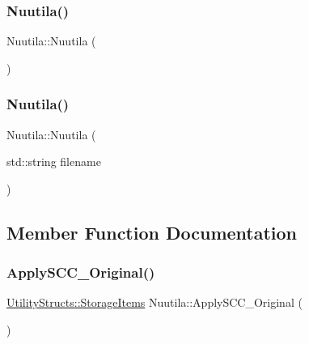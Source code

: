 \subsubsection{\texorpdfstring{Nuutila()}{Nuutila()}\hspace{0.1cm}{\footnotesize\ttfamily [1/2]}}
{\footnotesize\ttfamily Nuutila\+::\+Nuutila (\begin{DoxyParamCaption}{ }\end{DoxyParamCaption})\hspace{0.3cm}{\ttfamily [inline]}}

\mbox{\label{class_nuutila_a00bb9066a5a1c9fb03e25481f4f47a0c_a00bb9066a5a1c9fb03e25481f4f47a0c}} 
\subsubsection{\texorpdfstring{Nuutila()}{Nuutila()}\hspace{0.1cm}{\footnotesize\ttfamily [2/2]}}
{\footnotesize\ttfamily Nuutila\+::\+Nuutila (\begin{DoxyParamCaption}\item[{std\+::string}]{filename }\end{DoxyParamCaption})\hspace{0.3cm}{\ttfamily [inline]}}



\subsection{Member Function Documentation}
\mbox{\label{class_nuutila_a7d52f96cf25409704bfd7bf176fcc7c5_a7d52f96cf25409704bfd7bf176fcc7c5}} 
\subsubsection{\texorpdfstring{Apply\+S\+C\+C\+\_\+\+Original()}{ApplySCC\_Original()}}
{\footnotesize\ttfamily \hyperlink{struct_utility_structs_1_1_storage_items}{Utility\+Structs\+::\+Storage\+Items} Nuutila\+::\+Apply\+S\+C\+C\+\_\+\+Original (\begin{DoxyParamCaption}{ }\end{DoxyParamCaption})}

